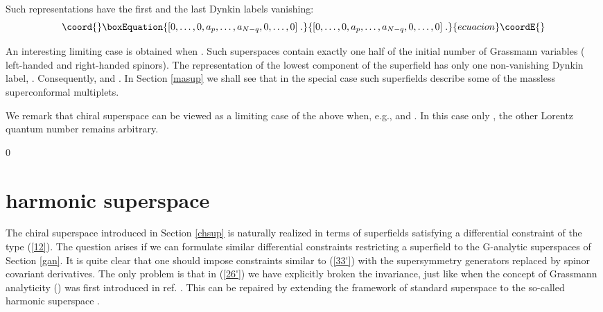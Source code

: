\documentclass[a4paper,12pt]{article}
\begin{document}
Such \coordHE{} representations have the first \coordHE{} and the 
last \coordHE{} Dynkin labels vanishing: 
\begin{equation}\coord{}\boxEquation{\label{35}
  [0,\ldots,0,a_{p},\ldots,a_{N-q},0,\ldots,0]\;.
}{[0,\ldots,0,a_{p},\ldots,a_{N-q},0,\ldots,0]\;.
}{ecuacion}\coordE{}\end{equation}
   
An interesting limiting case is obtained when \coordHE{}. Such 
superspaces contain exactly one half of the initial number of 
Grassmann variables (\coordHE{} left-handed and \coordHE{} right-handed 
spinors). The \coordHE{} representation of the lowest 
component of the superfield has only one non-vanishing Dynkin 
label, \coordHE{}. Consequently, \coordHE{} and 
\coordHE{}. In Section \ref{masup} we 
shall see that in the special case \coordHE{} such superfields 
describe some of the massless superconformal multiplets. 

We remark that chiral superspace can be viewed as a limiting case 
of the above when, e.g., \coordHE{} and \coordHE{}. In this case only 
\coordHE{}, the other Lorentz quantum number \coordHE{} remains arbitrary. 

\setcounter{equation}0 
\section{\coordHE{} harmonic superspace}\label{HSS}

The chiral superspace introduced in Section \ref{chsup} is 
naturally realized in terms of superfields satisfying a 
differential constraint of the type (\ref{12}). The question 
arises if we can formulate similar differential constraints 
restricting a superfield to the G-analytic superspaces of Section 
\ref{gan}. It is quite clear that one should impose constraints 
similar to (\ref{33'}) with the supersymmetry generators replaced 
by spinor covariant derivatives. The only problem is that in 
(\ref{26'}) we have explicitly broken the \coordHE{} 
invariance, just like when the concept of Grassmann analyticity 
(\coordHE{}) was first introduced in ref. \cite{GIO}. This can be 
repaired by extending the framework of standard superspace to the 
so-called harmonic superspace \cite{GIK1}. 
\end{document}
